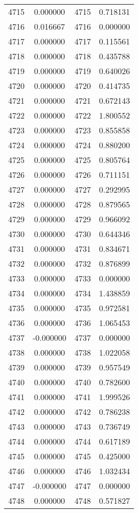 \documentclass[12pt]{article}
\begin{document}
\begin{longtable}{@{}cccc@{}}
4715 & 0.000000 & 4715 & 0.718131 \\
4716 & 0.016667 & 4716 & 0.000000 \\
4717 & 0.000000 & 4717 & 0.115561 \\
4718 & 0.000000 & 4718 & 0.435788 \\
4719 & 0.000000 & 4719 & 0.640026 \\
4720 & 0.000000 & 4720 & 0.414735 \\
4721 & 0.000000 & 4721 & 0.672143 \\
4722 & 0.000000 & 4722 & 1.800552 \\
4723 & 0.000000 & 4723 & 0.855858 \\
4724 & 0.000000 & 4724 & 0.880200 \\
4725 & 0.000000 & 4725 & 0.805764 \\
4726 & 0.000000 & 4726 & 0.711151 \\
4727 & 0.000000 & 4727 & 0.292995 \\
4728 & 0.000000 & 4728 & 0.879565 \\
4729 & 0.000000 & 4729 & 0.966092 \\
4730 & 0.000000 & 4730 & 0.644346 \\
4731 & 0.000000 & 4731 & 0.834671 \\
4732 & 0.000000 & 4732 & 0.876899 \\
4733 & 0.000000 & 4733 & 0.000000 \\
4734 & 0.000000 & 4734 & 1.438859 \\
4735 & 0.000000 & 4735 & 0.972581 \\
4736 & 0.000000 & 4736 & 1.065453 \\
4737 & -0.000000 & 4737 & 0.000000 \\
4738 & 0.000000 & 4738 & 1.022058 \\
4739 & 0.000000 & 4739 & 0.957549 \\
4740 & 0.000000 & 4740 & 0.782600 \\
4741 & 0.000000 & 4741 & 1.999526 \\
4742 & 0.000000 & 4742 & 0.786238 \\
4743 & 0.000000 & 4743 & 0.736749 \\
4744 & 0.000000 & 4744 & 0.617189 \\
4745 & 0.000000 & 4745 & 0.425000 \\
4746 & 0.000000 & 4746 & 1.032434 \\
4747 & -0.000000 & 4747 & 0.000000 \\
4748 & 0.000000 & 4748 & 0.571827 \\

\end{longtable}
\end{document}
